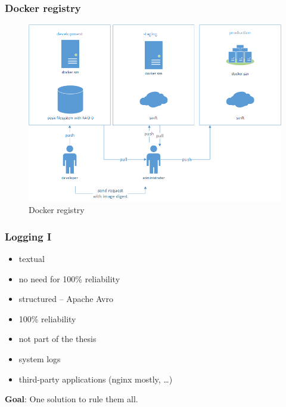     \begin{frame}
      \frametitle{Docker registry}
      \begin{figure}[htb]
			  \begin{center}
				  \includegraphics[width=1\textwidth]{img/docker-registry.png}
				  \caption{Docker registry}
			  \end{center}
		  \end{figure}
    \end{frame}
    
    \begin{frame}
      \frametitle{Logging I}
          \begin{itemize}
            \item textual
            \item no need for 100\% reliability
          \end{itemize} 
          \begin{itemize}
            \item structured -- Apache Avro \cite{apache-avro}
            \item 100\% reliability
            \item not part of the thesis
          \end{itemize}
          \begin{itemize}
            \item system logs
            \item third-party applications (nginx mostly, \ldots) 
          \end{itemize}
          
        \textbf{Goal}: One solution to rule them all.
    \end{frame}
    
